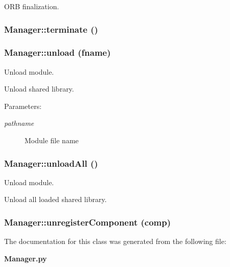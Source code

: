 ORB finalization. 

\subsubsection{\setlength{\rightskip}{0pt plus 5cm}Manager::terminate ()}\label{classManager_Managera1}


\subsubsection{\setlength{\rightskip}{0pt plus 5cm}Manager::unload (fname)}\label{classManager_Managera8}


Unload module. 

Unload shared library. \begin{Desc}
\item[Parameters:]
\begin{description}
\item[{\em pathname}]Module file name\end{description}
\end{Desc}
\subsubsection{\setlength{\rightskip}{0pt plus 5cm}Manager::unload\-All ()}\label{classManager_Managera9}


Unload module. 

Unload all loaded shared library.
\subsubsection{\setlength{\rightskip}{0pt plus 5cm}Manager::unregister\-Component (comp)}\label{classManager_Managera17}




The documentation for this class was generated from the following file:\begin{CompactItemize}
\item 
{\bf Manager.py}\end{CompactItemize}
